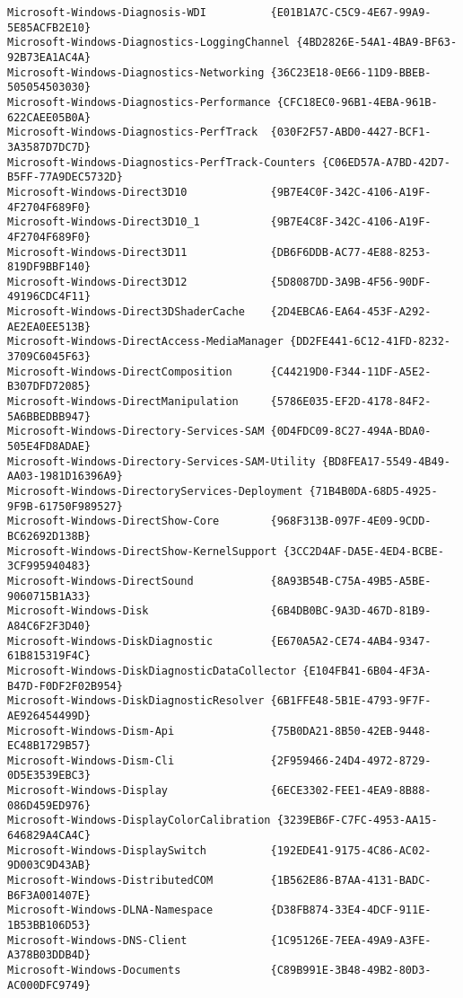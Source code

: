 \documentclass{report}
\begin{document}
\begin{lstlisting}[breaklines=true,basicstyle=\tiny]
Microsoft-Windows-Diagnosis-WDI          {E01B1A7C-C5C9-4E67-99A9-5E85ACFB2E10}
Microsoft-Windows-Diagnostics-LoggingChannel {4BD2826E-54A1-4BA9-BF63-92B73EA1AC4A}
Microsoft-Windows-Diagnostics-Networking {36C23E18-0E66-11D9-BBEB-505054503030}
Microsoft-Windows-Diagnostics-Performance {CFC18EC0-96B1-4EBA-961B-622CAEE05B0A}
Microsoft-Windows-Diagnostics-PerfTrack  {030F2F57-ABD0-4427-BCF1-3A3587D7DC7D}
Microsoft-Windows-Diagnostics-PerfTrack-Counters {C06ED57A-A7BD-42D7-B5FF-77A9DEC5732D}
Microsoft-Windows-Direct3D10             {9B7E4C0F-342C-4106-A19F-4F2704F689F0}
Microsoft-Windows-Direct3D10_1           {9B7E4C8F-342C-4106-A19F-4F2704F689F0}
Microsoft-Windows-Direct3D11             {DB6F6DDB-AC77-4E88-8253-819DF9BBF140}
Microsoft-Windows-Direct3D12             {5D8087DD-3A9B-4F56-90DF-49196CDC4F11}
Microsoft-Windows-Direct3DShaderCache    {2D4EBCA6-EA64-453F-A292-AE2EA0EE513B}
Microsoft-Windows-DirectAccess-MediaManager {DD2FE441-6C12-41FD-8232-3709C6045F63}
Microsoft-Windows-DirectComposition      {C44219D0-F344-11DF-A5E2-B307DFD72085}
Microsoft-Windows-DirectManipulation     {5786E035-EF2D-4178-84F2-5A6BBEDBB947}
Microsoft-Windows-Directory-Services-SAM {0D4FDC09-8C27-494A-BDA0-505E4FD8ADAE}
Microsoft-Windows-Directory-Services-SAM-Utility {BD8FEA17-5549-4B49-AA03-1981D16396A9}
Microsoft-Windows-DirectoryServices-Deployment {71B4B0DA-68D5-4925-9F9B-61750F989527}
Microsoft-Windows-DirectShow-Core        {968F313B-097F-4E09-9CDD-BC62692D138B}
Microsoft-Windows-DirectShow-KernelSupport {3CC2D4AF-DA5E-4ED4-BCBE-3CF995940483}
Microsoft-Windows-DirectSound            {8A93B54B-C75A-49B5-A5BE-9060715B1A33}
Microsoft-Windows-Disk                   {6B4DB0BC-9A3D-467D-81B9-A84C6F2F3D40}
Microsoft-Windows-DiskDiagnostic         {E670A5A2-CE74-4AB4-9347-61B815319F4C}
Microsoft-Windows-DiskDiagnosticDataCollector {E104FB41-6B04-4F3A-B47D-F0DF2F02B954}
Microsoft-Windows-DiskDiagnosticResolver {6B1FFE48-5B1E-4793-9F7F-AE926454499D}
Microsoft-Windows-Dism-Api               {75B0DA21-8B50-42EB-9448-EC48B1729B57}
Microsoft-Windows-Dism-Cli               {2F959466-24D4-4972-8729-0D5E3539EBC3}
Microsoft-Windows-Display                {6ECE3302-FEE1-4EA9-8B88-086D459ED976}
Microsoft-Windows-DisplayColorCalibration {3239EB6F-C7FC-4953-AA15-646829A4CA4C}
Microsoft-Windows-DisplaySwitch          {192EDE41-9175-4C86-AC02-9D003C9D43AB}
Microsoft-Windows-DistributedCOM         {1B562E86-B7AA-4131-BADC-B6F3A001407E}
Microsoft-Windows-DLNA-Namespace         {D38FB874-33E4-4DCF-911E-1B53BB106D53}
Microsoft-Windows-DNS-Client             {1C95126E-7EEA-49A9-A3FE-A378B03DDB4D}
Microsoft-Windows-Documents              {C89B991E-3B48-49B2-80D3-AC000DFC9749}

\end{lstlisting}
\end{document}
